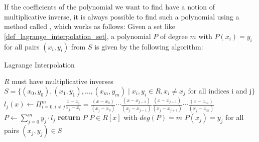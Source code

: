 If the coefficients of the polynomial we want to find have a notion of multiplicative inverse, it is always possible to find such a polynomial using a method called , which works as follows: Given a set like \ref{def_lagrange_interpolation_set}, a polynomial $P$ of degree $m$ with $P(x_i)=y_i$ for all pairs $(x_i,y_i)$ from $S$ is given by the following algorithm:

\begin{algorithm}\caption{Lagrange Interpolation}
\label{alg_lagrange_interplation}
\begin{algorithmic}[0]
\Require $R$ must have multiplicative inverses
\Require $S= \{(x_0,y_0), (x_1,y_1),\ldots,(x_m,y_m)\;|\; x_i,y_i\in R, x_i\neq x_j\text{ for all indices i and j}\}$
\State  $l_j(x) \gets \Pi_{i=0;i\neq j}^{m}\frac{x-x_i}{x_j-x_i} = \frac{(x-x_0)}{(x_j-x_0)} \cdots \frac{(x-x_{j-1})}{(x_j-x_{j - 1})} \frac{(x-x_{j+1})}{(x_j-x_{j+1})} \cdots \frac{(x-x_m)}{(x_j-x_m)}$
\EndFor
\State $P\gets \sum_{j=0}^m y_j\cdot l_j$
\State \textbf{return} $P$
\EndProcedure
\Ensure $P\in R[x]$ with $deg(P)=m$
\Ensure $P(x_j)=y_j$ for all pairs $(x_j,y_j)\in S$
\end{algorithmic}
\end{algorithm}

